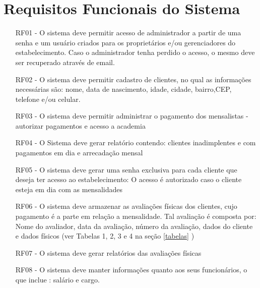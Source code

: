 





\section{Requisitos Funcionais do Sistema}
\label{secrf}
\begin{itemize}

\item[RF01 -]O sistema deve permitir acesso de administrador a partir de uma senha e um usuário criados para os proprietários e/ou gerenciadores do estabelecimento. Caso o administrador tenha perdido o acesso, o mesmo deve ser recuperado através de email.
\item[RF02 -] O sistema deve permitir cadastro de clientes, no qual as informações necessárias são: nome, data de nascimento, idade, cidade, bairro,CEP, telefone e/ou celular.
\item[RF03 -] O sistema deve permitir administrar o pagamento dos mensalistas - autorizar pagamentos e acesso a academia
\item[RF04 -] O Sistema deve gerar relatório contendo: clientes inadimplentes e com pagamentos em dia e arrecadação mensal
\item[RF05 -] O sistema deve gerar uma senha exclusiva para cada cliente que deseja ter acesso ao estabelecimento: O acesso é autorizado caso o cliente esteja em dia com as mensalidades
\item[RF06 -] O sistema deve armazenar as avaliações físicas dos clientes, cujo pagamento é a parte em relação a mensalidade. Tal avaliação é composta por: Nome do avaliador, data da avaliação, número da avaliação, dados do cliente e dados físicos (ver Tabelas 1, 2, 3 e 4 na seção \ref{tabelas} ) 
\item[RF07 - ] O sistema deve gerar relatórios das avaliações físicas
\item[RF08 - ] O sistema deve manter informações quanto aos seus funcionários, o que inclue : salário e cargo.


\end{itemize}


